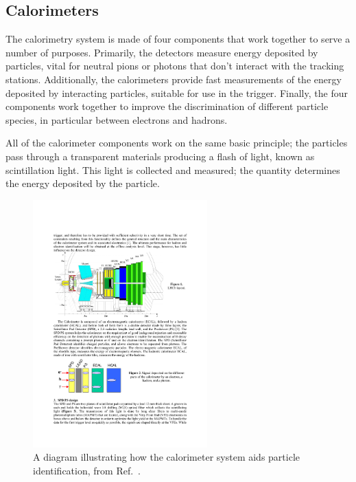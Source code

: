 \subsection{Calorimeters}

The calorimetry system is made of four components that work together to serve a number of purposes. 
Primarily, the detectors measure energy deposited by particles, vital for neutral pions or photons that don't interact with the tracking stations. Additionally, the calorimeters provide fast measurements of the energy deposited by interacting particles, suitable for use in the trigger. Finally, the four components work together to improve the discrimination of different particle species, in particular between electrons and hadrons. 



All of the calorimeter components work on the same basic principle; the particles pass through a transparent materials producing a flash of light, known as scintillation light. This light is collected and measured; the quantity determines the energy deposited by the particle.  



\begin{figure}[!h]
    \centering
    \includegraphics[width=0.6\textwidth]{figs/Detector/calo_layout.pdf}
    \caption{A diagram illustrating how the calorimeter system aids particle identification, from Ref.~\cite{1742-6596-293-1-012059}.}
    \label{fig:Dec_calo_layout}   
\end{figure}


